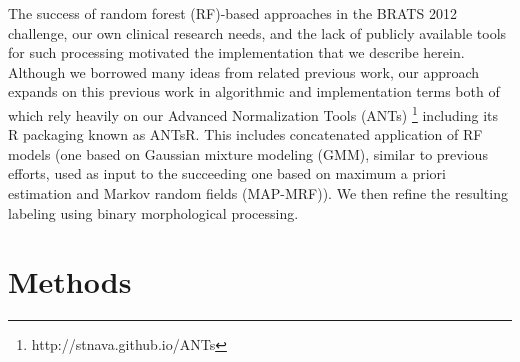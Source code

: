 \documentclass{llncs}
\begin{document}
The success of random forest (RF)-based approaches in the BRATS 2012 challenge, our 
own clinical research needs, and the lack of publicly available tools for such processing motivated the implementation that we describe herein.   Although we
borrowed many ideas from related previous work, our approach expands on this previous work in algorithmic and implementation terms both of which rely 
heavily on our Advanced Normalization Tools (ANTs)%
\footnote{
http://stnava.github.io/ANTs
} including its R packaging known as ANTsR.  
This includes concatenated application of RF models (one based on Gaussian mixture modeling (GMM), similar to previous efforts, used as input to the succeeding one based on maximum a priori estimation and Markov random fields (MAP-MRF)).  We then refine the resulting labeling using binary morphological processing.


\section{Methods}
\end{document}
